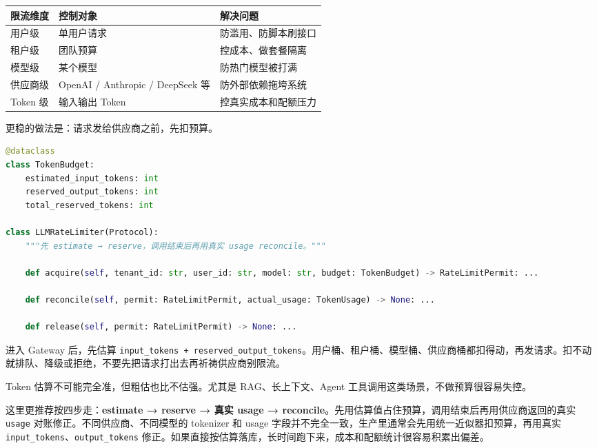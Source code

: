 \documentclass[9pt,a4paper,twocolumn]{ctexart}
\begin{document}
{\footnotesize
\begin{tabular}{|p{}|p{}|p{}|}
\hline
\textbf{限流维度} & \textbf{控制对象} & \textbf{解决问题} \\
\hline
用户级 & 单用户请求 & 防滥用、防脚本刷接口 \\
\hline
租户级 & 团队预算 & 控成本、做套餐隔离 \\
\hline
模型级 & 某个模型 & 防热门模型被打满 \\
\hline
供应商级 & OpenAI / Anthropic / DeepSeek 等 & 防外部依赖拖垮系统 \\
\hline
Token 级 & 输入输出 Token & 控真实成本和配额压力 \\
\hline
\end{tabular}
}



更稳的做法是：请求发给供应商之前，先扣预算。



\begin{lstlisting}[language=Python]
@dataclass
class TokenBudget:
    estimated_input_tokens: int
    reserved_output_tokens: int
    total_reserved_tokens: int

class LLMRateLimiter(Protocol):
    """先 estimate → reserve，调用结束后再用真实 usage reconcile。"""

    def acquire(self, tenant_id: str, user_id: str, model: str, budget: TokenBudget) -> RateLimitPermit: ...

    def reconcile(self, permit: RateLimitPermit, actual_usage: TokenUsage) -> None: ...

    def release(self, permit: RateLimitPermit) -> None: ...
\end{lstlisting}



进入 Gateway 后，先估算 \texttt{input\_tokens + reserved\_output\_tokens}。用户桶、租户桶、模型桶、供应商桶都扣得动，再发请求。扣不动就排队、降级或拒绝，不要先把请求打出去再祈祷供应商别限流。



Token 估算不可能完全准，但粗估也比不估强。尤其是 RAG、长上下文、Agent 工具调用这类场景，不做预算很容易失控。



这里更推荐按四步走：\textbf{estimate → reserve → 真实 usage → reconcile}。先用估算值占住预算，调用结束后再用供应商返回的真实 \texttt{usage} 对账修正。不同供应商、不同模型的 tokenizer 和 usage 字段并不完全一致，生产里通常会先用统一近似器扣预算，再用真实 \texttt{input\_tokens}、\texttt{output\_tokens} 修正。如果直接按估算落库，长时间跑下来，成本和配额统计很容易积累出偏差。
\end{document}
